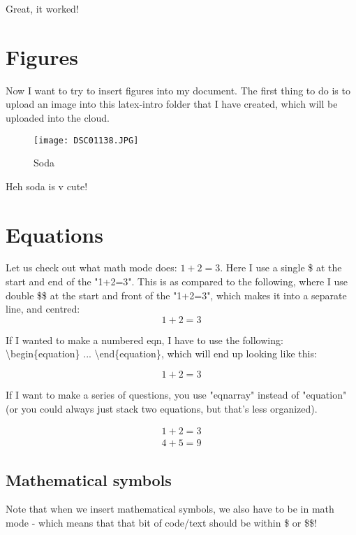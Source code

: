 \documentclass[a4paper, 12pt]{article}
\begin{document}
Great, it worked!

\newpage

\section{Figures}

Now I want to try to insert figures into my document. The first thing to do is to upload an image into this latex-intro folder that I have created, which will be uploaded into the cloud. 

\begin{figure}[h!]
    \centering
    \texttt{[image: DSC01138.JPG]}
    \caption{Soda}
    \label{fig:my_label}
\end{figure}

Heh soda is v cute!

\newpage

\section{Equations}

Let us check out what math mode does: $1 + 2 = 3$. Here I use a single \$ at the start and end of the "1+2=3". This is as compared to the following, where I use double \$\$ at the start and front of the "1+2=3", which makes it into a separate line, and centred: $$1 + 2 = 3$$

If I wanted to make a numbered eqn, I have to use the following: \\
\textbackslash begin\{equation\} ... \textbackslash end\{equation\}, which will end up looking like this: 

\begin{equation}
    1 + 2 = 3
\end{equation}

If I want to make a series of questions, you use "eqnarray" instead of "equation" (or you could always just stack two equations, but that's less organized). 

\begin{eqnarray}
    1 + 2 = 3 \\
    4 + 5 = 9
\end{eqnarray}

\subsection{Mathematical symbols}

Note that when we insert mathematical symbols, we also have to be in math mode - which means that that bit of code/text should be within \$ or \$\$!
\end{document}
